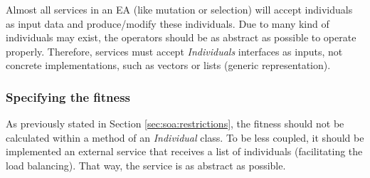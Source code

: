 Almost all services in an EA (like mutation or selection) will accept individuals as input data and produce/modify these individuals. Due to many kind of individuals may exist, the operators should be as abstract as possible to operate properly. Therefore, services must accept {\em Individuals} interfaces as inputs, not concrete implementations, such as vectors or lists (generic representation). 



\subsubsection{Specifying the fitness}




As previously stated in Section \ref{sec:soa:restrictions}, %
 the 
fitness should not be calculated within a method of an {\em Individual} class. To be less
coupled, it should be implemented an external service that receives a list of individuals (facilitating the load balancing). That way, the service is as abstract as possible. %

